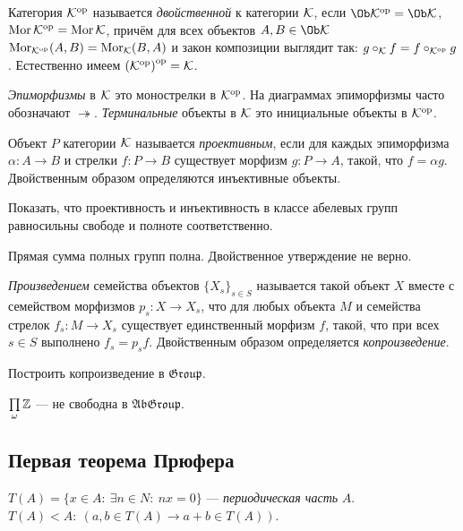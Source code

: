 \documentclass[10pt,a4paper]{article}%
\begin{document}
Категория ${\mathcal{K}}^{\mathrm{op}}$ называется {\em
двойственной} к категории $\mathcal{K}$,
если $\Ob\op{\Ck}=\Ob\Ck$, $\operatorname{Mor}{\mathcal{K}}^{\mathrm{op}}=\operatorname{Mor}\mathcal{K}$, причём для всех
объектов $A,B\in\Ob\Ck$ $\operatorname{Mor}_{{\mathcal{K}}^{\mathrm{op}}}(A,B)=\operatorname{Mor}_{\mathcal{K}}(B,A)$ и
закон композиции выглядит так: $g\circ_{\mathcal{K}}f=f\circ_{{\mathcal{K}}^{\mathrm{op}}}g$.
Естественно имеем ${({\mathcal{K}}^{\mathrm{op}})}^{\mathrm{op}}=\mathcal{K}$.

{\em Эпиморфизмы} в $\mathcal{K}$ это монострелки в
${\mathcal{K}}^{\mathrm{op}}$. На диаграммах эпиморфизмы часто обозначают
$\twoheadrightarrow$. {\em
Терминальные} объекты в $\mathcal{K}$ это
инициальные объекты в ${\mathcal{K}}^{\mathrm{op}}$.

Объект $P$ категории $\mathcal{K}$ называется {\em
проективным}, если для каждых
эпиморфизма $\alpha:A\to B$ и стрелки $f:P\to B$ существует
морфизм $g:P\to A$, такой, что $f=\alpha g$. Двойственным образом
определяются инъективные объекты.

\begin{problem} Показать, что проективность и инъективность в классе
абелевых групп равносильны свободе и полноте соответственно.
\end{problem}

Прямая сумма полных групп полна. Двойственное утверждение не
верно.

\vskip-12pt  \hangindent=-30mm 
{\em Произведением} семейства
объектов $\{X_s\}_{s\in S}$ называется такой объект $X$ вместе с
семейством морфизмов $p_s:X\to X_s$, что для любых объекта $M$ и
семейства стрелок $f_s:M\to X_s$ существует единственный морфизм
$f$, такой, что при всех $s\in S$ выполнено $f_s=p_sf$.
Двойственным образом определяется {\em
копроизведение}.

\begin{problem}
Построить копроизведение в $\mathfrak{Group}$.
\end{problem}

\begin{problem} $\prod\limits_\omega \mathbb Z$ --- не свободна в
$\mathfrak{AbGroup}$.
\end{problem}

\subsection{Первая теорема Прюфера}

$T(A)=\{x\in A:~\exists n\in N:~nx=0\}$ --- {\em периодическая
часть} $A$. $T(A)<A:~(a,b\in
T(A)\rightarrow a+b\in T(A))$.
\end{document}
